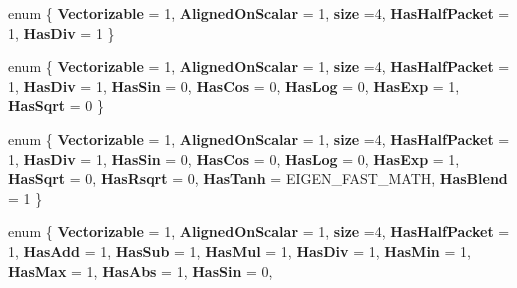 \begin{DoxyCompactItemize}
enum \{ \newline
{\bfseries Vectorizable} = 1, 
{\bfseries Aligned\+On\+Scalar} = 1, 
{\bfseries size} =4, 
{\bfseries Has\+Half\+Packet} = 1, 
\newline
{\bfseries Has\+Div} = 1
 \}
\item 
\mbox{\label{struct_eigen_1_1internal_1_1packet__traits_3_01float_01_4_a578d4e3a8162e6ccf2d0c424c3f42c7d}} 
enum \{ \newline
{\bfseries Vectorizable} = 1, 
{\bfseries Aligned\+On\+Scalar} = 1, 
{\bfseries size} =4, 
{\bfseries Has\+Half\+Packet} = 1, 
\newline
{\bfseries Has\+Div} = 1, 
{\bfseries Has\+Sin} = 0, 
{\bfseries Has\+Cos} = 0, 
{\bfseries Has\+Log} = 0, 
\newline
{\bfseries Has\+Exp} = 1, 
{\bfseries Has\+Sqrt} = 0
 \}
\item 
\mbox{\label{struct_eigen_1_1internal_1_1packet__traits_3_01float_01_4_abfd2e81123a7a49d06e202e9910b3e33}} 
enum \{ \newline
{\bfseries Vectorizable} = 1, 
{\bfseries Aligned\+On\+Scalar} = 1, 
{\bfseries size} =4, 
{\bfseries Has\+Half\+Packet} = 1, 
\newline
{\bfseries Has\+Div} = 1, 
{\bfseries Has\+Sin} = 0, 
{\bfseries Has\+Cos} = 0, 
{\bfseries Has\+Log} = 0, 
\newline
{\bfseries Has\+Exp} = 1, 
{\bfseries Has\+Sqrt} = 0, 
{\bfseries Has\+Rsqrt} = 0, 
{\bfseries Has\+Tanh} = E\+I\+G\+E\+N\+\_\+\+F\+A\+S\+T\+\_\+\+M\+A\+TH, 
\newline
{\bfseries Has\+Blend} = 1
 \}
\item 
\mbox{\label{struct_eigen_1_1internal_1_1packet__traits_3_01float_01_4_a6dd01efa3502fb6efd6fbe4163de902c}} 
enum \{ \newline
{\bfseries Vectorizable} = 1, 
{\bfseries Aligned\+On\+Scalar} = 1, 
{\bfseries size} =4, 
{\bfseries Has\+Half\+Packet} = 1, 
\newline
{\bfseries Has\+Add} = 1, 
{\bfseries Has\+Sub} = 1, 
{\bfseries Has\+Mul} = 1, 
{\bfseries Has\+Div} = 1, 
\newline
{\bfseries Has\+Min} = 1, 
{\bfseries Has\+Max} = 1, 
{\bfseries Has\+Abs} = 1, 
{\bfseries Has\+Sin} = 0, 

\end{DoxyCompactItemize}
